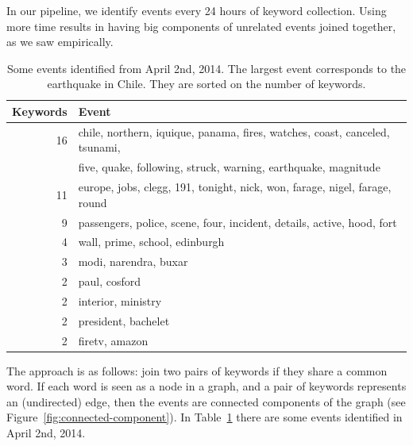 In our pipeline, we identify events every 24 hours of keyword collection. 
%
Using more time results in having big components of unrelated events joined
together, as we saw empirically.


\begin{table}
\begin{center}
\begin{tabular}{rl}
\toprule
 Keywords  &  Event                                                                        \\
\midrule
       16  &  chile, northern, iquique, panama, fires, watches, coast, canceled, tsunami,  \\
           &  five, quake, following, struck, warning, earthquake, magnitude               \\
       11  &  europe, jobs, clegg, 191, tonight, nick, won, farage, nigel, farage, round   \\
        9  &  passengers, police, scene, four, incident, details, active, hood, fort       \\
        4  &  wall, prime, school, edinburgh                                               \\
        3  &  modi, narendra, buxar                                                        \\
        2  &  paul, cosford                                                                \\
        2  &  interior, ministry                                                           \\
        2  &  president, bachelet                                                          \\
        2  &  firetv, amazon                                                               \\
\bottomrule
\end{tabular}
\end{center}

\caption[Some events identified from April 2nd, 2014.]{Some events
  identified from April 2nd, 
  2014. The largest event corresponds to the earthquake in Chile. They
  are sorted on the number of keywords.}\label{table:example-events}
\end{table}

The approach is as follows: join two pairs of keywords if they share a common
word.
%
If each word is seen as a node in a graph, and a pair of keywords represents an
(undirected) edge, then the events are connected components of the graph (see
Figure~\ref{fig:connected-component}).
%
In Table~\ref{table:example-events} there are some events identified in April
2nd, 2014. 


